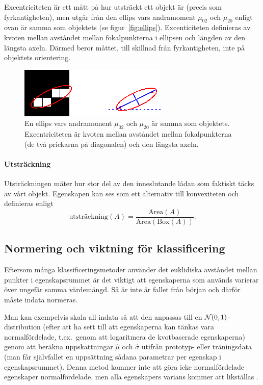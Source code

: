 \documentclass[../rapport_MVEX01-11-05]{subfiles}
\begin{document}
Excentriciteten är ett mått på hur utsträckt ett objekt är (precis som
fyrkantigheten), men utgår från den ellips
vars andramoment $\mu_{02}$ och $\mu_{20}$ enligt ovan är samma som
objektets (se figur~\vref{fig:ellips}). Excenticiteten definieras av
kvoten mellan avståndet
mellan fokalpunkterna i ellipsen och längden av den längsta axeln. Därmed
beror måttet, till skillnad från fyrkantigheten, inte på objektets orientering.

\begin{figure}[tb]
	\centering 
	\includegraphics{bilder/matlab-ellips.png}
	\caption{En ellips vars andramoment $\mu_{02}$ och $\mu_{20}$ är samma
	som objektets. Excentriciteten är kvoten mellan avståndet
        mellan fokalpunkterna (de två prickarna på diagonalen) och den
        längsta axeln.}
	\label{fig:ellips}
\end{figure}

\paragraph{Utsträckning}

Utsträckningen mäter hur stor del av den inneslutande lådan som
faktiskt täcks av vårt objekt. Egenskapen kan ses som ett alternativ
till konvexiteten och definieras enligt
\begin{equation*}
  \textrm{utsträckning}(A) =
  \frac{\textrm{Area}(A)}{\textrm{Area}(\textrm{Box}(A))}.
\end{equation*}

\subsection{Normering och viktning för klassificering}\label{sec:normering}
Eftersom många klassificeringsmetoder använder det euklidiska avståndet mellan punkter i 
egenskapsrummet är det viktigt att egenskaperna som används varierar över
ungefär samma värdemängd. Så är inte är fallet från början och därför måste indata
normeras.

Man kan exempelvis skala all indata så att den anpassas till en 
$\mathcal{N}(0,1)$-distribution (efter att ha sett till att egenskaperna kan tänkas 
vara normalfördelade, t.ex.~genom att logaritmera de kvotbaserade 
egenskaperna) genom att beräkna uppskattningar $\hat\mu$ och $\hat\sigma$
utifrån prototyp- eller träningsdata (man får självfallet en uppsättning sådana
parametrar per egenskap i egenskapsrummet). Denna metod kommer inte
att göra icke normalfördelade egenskaper normalfördelade, men alla
egenskapers varians kommer att likställas \cite{Aksoy01}.
\end{document}
